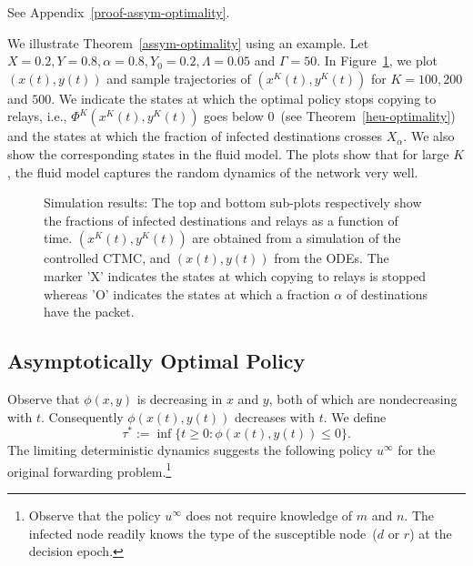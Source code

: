 \documentclass[10pt,journal,letterpaper]{IEEEtran}
\newtheorem{theorem}{Theorem}[section]
\newcommand{\remove}[1]{}
\begin{document}
\begin{IEEEproof}
See Appendix~\ref{proof-assym-optimality}.
\end{IEEEproof}
\remove{
Moreover, we also obtain the following result.
\begin{theorem}
\label{thm:asym-stop-time}
For every $\epsilon > 0$,
\begin{equation*}
\lim_{K \rightarrow \infty} \mathbb{P}\left(\left|\frac{m(\tau)}{M} - \alpha\right| > \epsilon \right) = 0.
\end{equation*}
\end{theorem}
\begin{IEEEproof}
\end{IEEEproof}
}
We illustrate Theorem~\ref{assym-optimality} using an example. Let $X = 0.2,Y = 0.8,\alpha = 0.8,Y_0 = 0.2,\Lambda = 0.05$
and $\Gamma = 50$. In Figure~\ref{fig:kurtz}, we plot $(x(t),y(t))$ and
sample trajectories of $(x^K(t),y^K(t))$ for $K = 100,200$
and $500$. We indicate the states at which the optimal policy stops copying to
relays, i.e., $\Phi^K(x^K(t),y^K(t))$ goes below $0$~(see Theorem~\ref{heu-optimality})
and the states at which the fraction of infected destinations crosses $X_{\alpha}$.
We also show the corresponding states in the fluid model.
The plots show that for large $K$, the fluid model captures the random dynamics
of the network very well.
\begin{figure}[t]
\centering
{}
\caption{Simulation results: The top and bottom sub-plots
respectively show the fractions of infected destinations and relays
as a function of time. $(x^K(t),y^K(t))$ are obtained from a
simulation of the controlled CTMC, and $(x(t),y(t))$ from the ODEs.
The marker 'X' indicates the states at which copying to relays is
stopped whereas 'O' indicates the states at which a fraction $\alpha$
of destinations have the packet.} \label{fig:kurtz}
\end{figure}

\subsection{Asymptotically Optimal Policy}
Observe that $\phi(x,y)$ is decreasing in $x$ and $y$, both of which are nondecreasing with $t$. Consequently
$\phi(x(t),y(t))$ decreases with $t$. We define
\begin{equation}
\label{eqn:stop-relays}
\tau^{\ast} := \inf\{t \geq 0: \phi(x(t),y(t)) \leq 0\}.
\end{equation}
The limiting deterministic dynamics suggests the following policy
$u^{\infty}$ for the original forwarding problem.\footnote{Observe that the policy $u^{\infty}$ does not require
knowledge of $m$ and $n$. The infected node readily knows the type
of the susceptible node~($d$ or $r$) at the decision epoch.}
\end{document}
